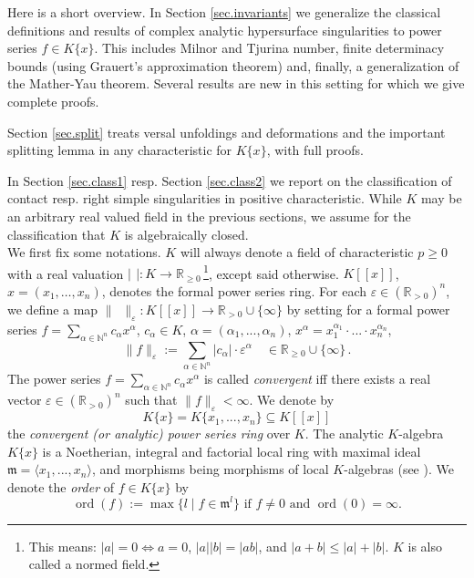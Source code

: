 \documentclass[11pt]{article}
\DeclareMathOperator{\ord}{ord}
\newcommand{\N}{{\mathbb N}}
\newcommand{\R}{{\mathbb R}}
\newcommand{\fm}{\mathfrak{m}}
\newcommand{\eps}{\varepsilon}
\begin{document}
Here is a short overview. In Section \ref{sec.invariants} we generalize the classical definitions and results of complex analytic hypersurface singularities to power series $f\in K\{x\}$. This includes Milnor and Tjurina number, finite determinacy bounds (using Grauert's approximation theorem) and, finally, a generalization of the Mather-Yau theorem. Several results are new in this setting for which we give complete proofs.

Section \ref{sec.split} treats versal unfoldings and deformations and the important splitting lemma in any characteristic for $K\{x\}$, with full proofs.

In Section \ref{sec.class1} resp. Section \ref{sec.class2}  we report on the classification of contact resp. right simple singularities in positive characteristic. While $K$ may be an arbitrary real valued field in the previous sections, we assume for the classification that $K$ is algebraically closed.\\


We first fix some notations.  $K$ will always denote a field of characteristic $p \ge 0$ with a real valuation $| \, \ | :K \to \R_{\ge 0}$\,\footnote{This means: $ |a| = 0 \Leftrightarrow a=0$, $ |a||b| = |ab|$, and $|a+b| \le |a|+|b|$. $K$ is also called a normed field.}, except said otherwise. 
$K[[x]]$, $x=(x_1,\ldots,x_n)$, denotes the formal power series ring.
For each \mbox{${\eps}\in
  (\R_{>0})^n$}, we
define a map 
$\|\phantom{f}\|_{\eps}:K[[x]]\to \R_{>0}\cup  \{\infty\}$
   by setting for a formal power series
   \mbox{$f  =  \sum_{{\alpha}\in\N^n}c_{\alpha} {x}^{\alpha} $}, $c_\alpha \in K$, 
   $\alpha=(\alpha_1,...,\alpha_n)$, 
   $x^\alpha=x_1^{\alpha_1}\cdot...\cdot x_n^{\alpha_n}$,
$$\|f\|_{\eps}:= \sum_{{\alpha} \in \N^n} |c_{\alpha}|\cdot
{\eps}^{{\alpha}}\quad \in \R_{\ge 0}\cup \{\infty\}\,.$$
The power series
\mbox{$f  =  \sum_{{\alpha}\in\N^n}c_{\alpha} {x}^{\alpha} $}
is called {\em convergent}
iff there exists a real vector \mbox{$\eps\in(\R_{>0})^n$}
such that \mbox{$ \| f \|_{\eps} < \infty $}.
We denote by 
$$K\{x\}=K\{x_1,...,x_n\} \subseteq K[[x]]$$
the {\em convergent (or analytic) power series ring} over $K$. The analytic $K$-algebra 
$K\{ x\}$ is a Noetherian, integral and factorial local ring  with maximal ideal $\fm =  \langle x_1,...,x_n \rangle$, and morphisms being morphisms of local $K$-algebras (see \cite[Section I.1.2]{GLS25}). 
We denote  the {\em order} of $f \in K\{x\}$ 
by 
$$\ord(f) := \max \{l \mid f \in \fm^l\}\text{ if }f \ne 0\text{ and }\ord(0)=\infty.$$ 
\end{document}
